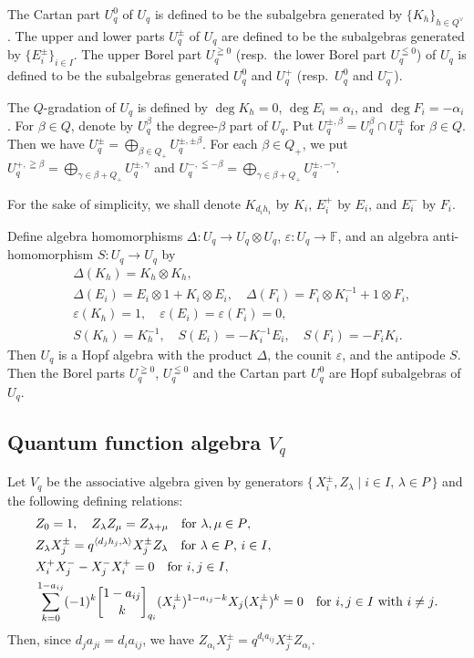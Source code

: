 \documentclass[12pt,a4paper]{article}
\newcommand\bra{\langle}
\newcommand\ket{\rangle}
\newcommand\ah{h}
\newcommand\Qv{Q^\vee}
\newcommand\eps{\varepsilon}
\newcommand\F{{\mathbb F}} %
\theoremstyle{plain} %
\theoremstyle{definition} %
\theoremstyle{definition} %
\numberwithin{theorem}{section}
\numberwithin{equation}{section}
\numberwithin{figure}{section}
\numberwithin{table}{section}
\begin{document}
The Cartan part $U_q^0$ of $U_q$ is defined to be 
the subalgebra generated by $\{K_h\}_{h\in\Qv}$.
The upper and lower parts $U_q^\pm$ of $U_q$ 
are defined to be the subalgebras generated by $\{E_i^\pm\}_{i\in I}$.
The upper Borel part $U_q^{\geqq0}$ (resp.\ the lower Borel part $U_q^{\leqq0}$) 
of $U_q$ is defined to be the subalgebras generated $U_q^0$ and $U_q^+$
(resp.\ $U_q^0$ and $U_q^-$).

The $Q$-gradation of $U_q$ is defined by 
$\deg K_h=0$, $\deg E_i=\alpha_i$, and $\deg F_i=-\alpha_i$.
For $\beta\in Q$, denote by $U_q^\beta$ the degree-$\beta$ part of $U_q$.
Put $U_q^{\pm,\beta}=U_q^\beta\cap U_q^\pm$ for $\beta\in Q$.
Then we have $U_q^\pm=\bigoplus_{\beta\in Q_+}U_q^{\pm,\pm\beta}$.
For each $\beta\in Q_+$, we
put $U_q^{+,\geqq\beta}=\bigoplus_{\gamma\in\beta+Q_+}U_q^{\pm,\gamma}$
and $U_q^{-,\leqq -\beta}=\bigoplus_{\gamma\in\beta+Q_+}U_q^{\pm,-\gamma}$.

For the sake of simplicity, 
we shall denote $K_{d_i\ah_i}$ by $K_i$, $E_i^+$ by $E_i$, and $E_i^-$ by $F_i$.

Define algebra homomorphisms $\Delta:U_q\to U_q\otimes U_q$, 
$\eps:U_q\to\F$, and an algebra anti-homomorphism $S:U_q\to U_q$ by
\begin{align*}
 &
 \Delta(K_h) = K_h\otimes K_h,
 \\ &
 \Delta(E_i) = E_i\otimes 1        + K_i\otimes E_i, \quad
 \Delta(F_i) = F_i\otimes K_i^{-1} +   1\otimes F_i,
 \\ &
 \eps(K_h) = 1, \quad 
 \eps(E_i) = \eps(F_i) = 0,
 \\ &
 S(K_h) = K_h^{-1}, \quad
 S(E_i) = -K_i^{-1}E_i, \quad S(F_i) = -F_iK_i.
\end{align*}
Then $U_q$ is a Hopf algebra with the product $\Delta$, 
the counit $\eps$, and the antipode $S$.
Then the Borel parts $U_q^{\geqq0}$, $U_q^{\leqq0}$ 
and the Cartan part $U_q^0$ are Hopf subalgebras of $U_q$.

\subsection{Quantum function algebra $V_q$}

Let $V_q$ be the associative algebra given 
by generators $\{\,X_i^\pm,Z_\lambda\mid i\in I,\,\lambda\in P\,\}$ 
and the following defining relations:
\begin{align*}
 &
 Z_0 = 1, \quad Z_\lambda Z_\mu = Z_{\lambda+\mu}
 \quad \text{for $\lambda,\mu\in P$},
 \\ &
 Z_\lambda X_j^\pm = q^{\bra d_j\ah_j,\lambda\ket} X_j^\pm Z_\lambda
 \quad \text{for $\lambda\in P$, $i\in I$},
 \\ &
 X_i^+ X_j^- - X_j^- X_i^+ = 0 \quad \text{for $i,j\in I$},
 \\ &
 \sum_{k=0}^{1-a_{ij}} (-1)^k
 \qbinom{1-a_{ij}}{k}_{q_i} (X_i^\pm)^{1-a_{ij}-k} X_j (X_i^\pm)^k = 0
 \quad \text{for $i,j\in I$ with $i\ne j$}.
\end{align*}
Then, since $d_ja_{ji}=d_ia_{ij}$, 
we have $Z_{\alpha_i}X_j^\pm = q^{d_ia_{ij}} X_j^\pm Z_{\alpha_i}$.
\end{document}
